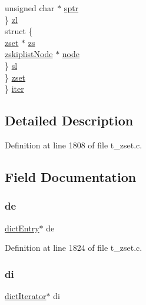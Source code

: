\begin{DoxyCompactItemize}
\begin{tabbing}
\>\>\>unsigned char $\ast$ \hyperlink{structzsetopsrc_a6d94cfd968493648b308d82dbbba29ad}{sptr}\\
\>\>\} \hyperlink{structzsetopsrc_a1e59c58aa883d968f1b76dda5007f997}{zl}\\
\>\>struct \{\\
\>\>\>\hyperlink{structzset}{zset} $\ast$ \hyperlink{structzsetopsrc_acfaaf23971feb28907603a957a249d76}{zs}\\
\>\>\>\hyperlink{structzskiplist_node}{zskiplistNode} $\ast$ \hyperlink{structzsetopsrc_aa0621020c7ab4834a7085ba6403923f3}{node}\\
\>\>\} \hyperlink{structzsetopsrc_a990a7be8e5af7e6ce7367fb6f6ccb00e}{sl}\\
\>\} \hyperlink{structzsetopsrc_a70d92d92e5ed083a01384708f2e5c6eb}{zset}\\
\} \hyperlink{structzsetopsrc_a8a89af2cb6f746c6a9df3b35d078af7c}{iter}\\

\end{tabbing}\end{DoxyCompactItemize}


\subsection{Detailed Description}


Definition at line 1808 of file t\+\_\+zset.\+c.



\subsection{Field Documentation}
\mbox{\label{structzsetopsrc_ad42c838fd43654444c8d4492319e1949}} 
\subsubsection{\texorpdfstring{de}{de}}
{\footnotesize\ttfamily \hyperlink{structdict_entry}{dict\+Entry}$\ast$ de}



Definition at line 1824 of file t\+\_\+zset.\+c.

\mbox{\label{structzsetopsrc_a30e26ff2250d4d8b49241087d755342a}} 
\subsubsection{\texorpdfstring{di}{di}}
{\footnotesize\ttfamily \hyperlink{structdict_iterator}{dict\+Iterator}$\ast$ di}



